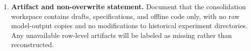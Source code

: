 \documentclass[11pt]{article}
\begin{document}
\begin{enumerate}
  \item \textbf{Artifact and non-overwrite statement.} Document that the consolidation workspace contains drafts, specifications, and offline code only, with no raw model-output copies and no modifications to historical experiment directories. Any unavailable row-level artifacts will be labeled as missing rather than reconstructed.
\end{enumerate}


\end{document}
